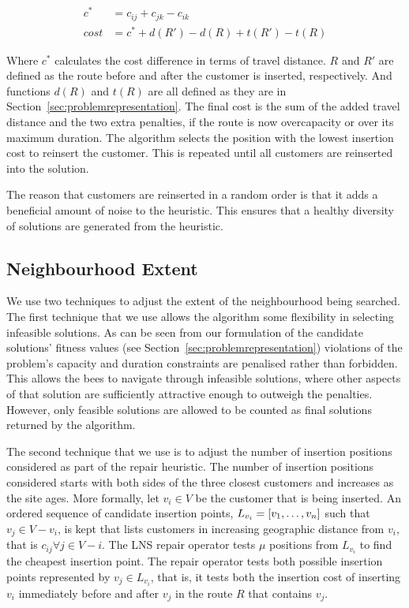 \begin{align}
   c^*   &= c_{ij} + c_{jk} - c_{ik} \\
   cost  &= c^* + d(R') - d(R) + t(R') - t(R)
\end{align}

Where $c^*$ calculates the cost difference in terms of travel distance. $R$ and $R'$ are defined as the route before and after the customer is inserted, respectively. And functions $d(R)$ and $t(R)$ are all defined as they are in Section~\ref{sec:problemrepresentation}. The final cost is the sum of the added travel distance and the two extra penalties, if the route is now overcapacity or over its maximum duration. The algorithm selects the position with the lowest insertion cost to reinsert the customer. This is repeated until all customers are reinserted into the solution. 

The reason that customers are reinserted in a random order is that it adds a beneficial amount of noise to the heuristic. This ensures that a healthy diversity of solutions are generated from the heuristic. 

\subsection{Neighbourhood Extent}
\label{subsec:neighborhoodscope}

We use two techniques to adjust the extent of the neighbourhood being searched. The first technique that we use allows the algorithm some flexibility in selecting infeasible solutions. As can be seen from our formulation of the candidate solutions' fitness values (see Section~\ref{sec:problemrepresentation}) violations of the problem's capacity and duration constraints are penalised rather than forbidden. This allows the bees to navigate through infeasible solutions, where other aspects of that solution are sufficiently attractive enough to outweigh the penalties. However, only feasible solutions are allowed to be counted as final solutions returned by the algorithm.

The second technique that we use is to adjust the number of insertion positions considered as part of the repair heuristic. The number of insertion positions considered starts with both sides of the three closest customers and increases as the site ages. More formally, let $v_i \in V$ be the customer that is being inserted. An ordered sequence of candidate insertion points, $L_{v_i} = [v_1,\ldots,v_n]$ such that $v_j \in V - v_i$, is kept that lists customers in increasing geographic distance from $v_i$, that is $c_{ij} \forall j \in V - i$. The LNS repair operator tests $\mu$ positions from $L_{v_i}$ to find the cheapest insertion point. The repair operator tests both possible insertion points represented by $v_j \in L_{v_i}$, that is, it tests both the insertion cost of inserting $v_i$ immediately before and after $v_j$ in the route $R$ that contains $v_j$. 

